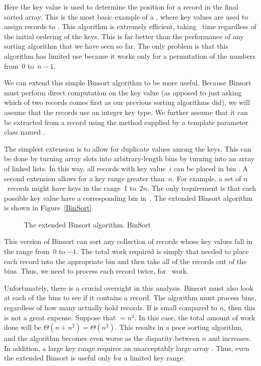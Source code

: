 
\noindent Here the key value is used to determine the
position for a record in the final sorted array.
This is the most basic example of a , where key values
are used to assign records to .
This algorithm is extremely efficient, taking \Thetan\ time regardless
of the initial ordering of the keys.
This is far better than the performance of any sorting
algorithm that we have seen so far.
The only problem is that this algorithm has limited use because it
works only for a permutation of the numbers from~0 to~\(n-1\).

We can extend this simple Binsort algorithm to be more useful.
Because Binsort must perform direct computation on the key value (as
opposed to just asking which of two records comes first as our
previous sorting algorithms did),
we will assume that the records use an integer key type.
{We further assume that it can be extracted from a record using the
 method supplied by a template parameter class named
.}{}

The simplest extension is to allow for duplicate values among the
keys.
This can be done by turning array slots into arbitrary-length bins by
turning  into an array of linked lists.
In this way, all records with key value~\(i\) can be placed in bin
.
A second extension allows for a key range greater than~\(n\).
For example, a set of \(n\)~records might have keys in the range~1
to~\(2n\).
The only requirement is that each possible key value have a
corresponding bin in~.
The extended Binsort algorithm is shown in Figure~\ref{BinSort}.

\begin{figure}

\vspace{-\bigskipamount}
{The extended Binsort algorithm.}
{BinSort}
\end{figure}

This version of Binsort can sort any collection of records whose key
values fall in the range from~0 to \(-1\).
The total work required is simply that needed to place each record
into the appropriate bin and then take all of the records out of the
bins.
Thus, we need to process each record twice, for \Thetan\ work.

Unfortunately, there is a crucial oversight in this analysis.
Binsort must also look at each of the bins to see if it
contains a record.
The algorithm must process 
bins, regardless of how many actually hold records.
If \-   %
 is small compared to \(n\), then this is not a great expense.
Suppose that  \( = n^2\).
In this case, the total amount of work done will be
\(\Theta(n + n^2) = \Theta(n^2) \).
This results in a poor sorting algorithm, and the algorithm becomes
even worse as the disparity between \(n\) and 
increases.
In addition, a large key range requires an unacceptably large array
.
Thus, even the extended Binsort is useful only for a limited key
range.

